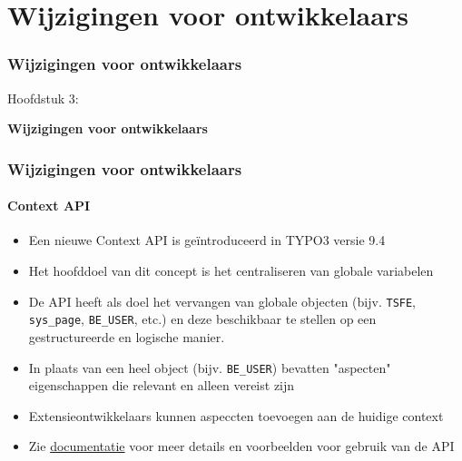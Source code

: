 %

\section{Wijzigingen voor ontwikkelaars}
\begin{frame}[fragile]
	\frametitle{Wijzigingen voor ontwikkelaars}

	\begin{center}\huge{Hoofdstuk 3:}\end{center}
	\begin{center}\huge{\color{typo3darkgrey}\textbf{Wijzigingen voor ontwikkelaars}}\end{center}

\end{frame}


\begin{frame}[fragile]
	\frametitle{Wijzigingen voor ontwikkelaars}
	\framesubtitle{Context API}

	\begin{itemize}
		\item Een nieuwe Context API is geïntroduceerd in TYPO3 versie 9.4
		\item Het hoofddoel van dit concept is het centraliseren van globale variabelen
		\item De API heeft als doel het vervangen van globale objecten (bijv.
			\texttt{TSFE}, \texttt{sys\_page}, \texttt{BE\_USER}, etc.) en deze
			beschikbaar te stellen op een gestructureerde en logische manier.
		\item In plaats van een heel object (bijv. \texttt{BE\_USER}) bevatten
			"aspecten" eigenschappen die relevant en alleen vereist zijn
		\item Extensieontwikkelaars kunnen aspeccten toevoegen aan de huidige
			context
		\item Zie \href{https://docs.typo3.org/typo3cms/extensions/core/latest/Changelog/9.4/Feature-85389-ContextAPIForConsistentDataHandling.rst}{documentatie}
			voor meer details en voorbeelden voor gebruik van de API
	\end{itemize}

\end{frame}

